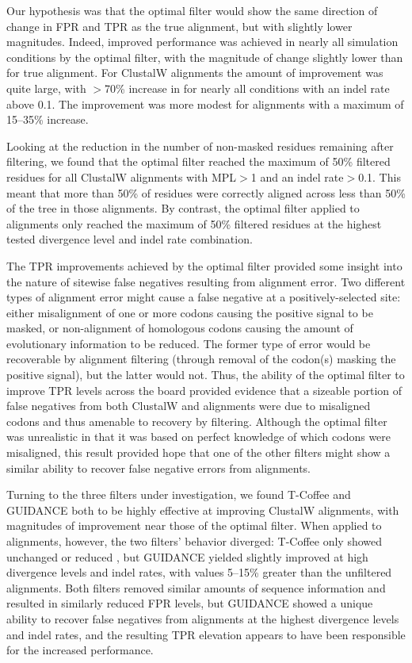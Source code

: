 \documentclass{article}
\begin{document}
Our hypothesis was that the optimal filter would show the same
direction of change in FPR and TPR as the true alignment, but with
slightly lower magnitudes. Indeed, improved \sw performance was
achieved in nearly all simulation conditions by the optimal filter,
with the magnitude of \tpr change slightly lower than for true
alignment. For ClustalW alignments the amount of improvement was quite
large, with $>$70\% increase in \tpr for nearly all conditions with an
indel rate above 0.1. The improvement was more modest for \prankc
alignments with a maximum of 15--35\% \tpr increase.

Looking at the reduction in the number of non-masked residues
remaining after filtering, we found that the optimal filter reached
the maximum of 50\% filtered residues for all ClustalW alignments with
MPL$>$1 and an indel rate$>$0.1. This meant that more than 50\% of
residues were correctly aligned across less than 50\% of the tree in
those alignments. By contrast, the optimal filter applied to \prankc
alignments only reached the maximum of 50\% filtered residues at the
highest tested divergence level and indel rate combination.

The TPR improvements achieved by the optimal filter provided some
insight into the nature of sitewise false negatives resulting from
alignment error. Two different types of alignment error might cause a
false negative at a positively-selected site: either misalignment of
one or more \nh codons causing the positive signal to be
masked, or non-alignment of homologous codons causing the amount of
evolutionary information to be reduced. The former type of error would
be recoverable by alignment filtering (through removal of the codon(s)
masking the positive signal), but the latter would not. Thus, the
ability of the optimal filter to improve TPR levels across the board
provided evidence that a sizeable portion of false negatives from both
ClustalW and \prankc alignments were due to misaligned codons and thus
amenable to recovery by filtering. Although the optimal filter was
unrealistic in that it was based on perfect knowledge of which codons
were misaligned, this result provided hope that one of the other
filters might show a similar ability to recover false negative errors
from \prankc alignments.

Turning to the three filters under investigation, we found T-Coffee
and GUIDANCE both to be highly effective at improving ClustalW
alignments, with magnitudes of improvement near those of the optimal
filter. When applied to \prankc alignments, however, the two filters'
behavior diverged: T-Coffee only showed unchanged or reduced \tpr, but
GUIDANCE yielded slightly improved \tpr at high divergence levels and
indel rates, with values 5--15\% greater than the unfiltered \prankc
alignments. Both filters removed similar amounts of sequence
information and resulted in similarly reduced FPR levels, but GUIDANCE
showed a unique ability to recover false negatives from \prankc
alignments at the highest divergence levels and indel rates, and the
resulting TPR elevation appears to have been responsible for the
increased \tpr performance.
\end{document}
